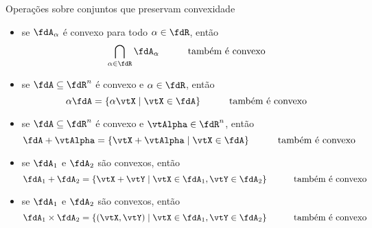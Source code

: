 \begin{frame}{Operações sobre conjuntos que preservam convexidade}
  \vspace*{-0.5\baselineskip}
  \begin{itemize}\footnotesize{}
    \item {}  se $ \fdA_{\alpha}$ é convexo para todo $\alpha \in \fdR$, então %
    \begin{equation}\label{eq_oper_inter}
      \bigcap_{\alpha \in \fdR} \fdA_{\alpha} \quad \quad \quad \text{também é convexo}
    \end{equation} %

    \item {}  se $ \fdA \subseteq \fdR^n$ é convexo e $\alpha \in \fdR$, então %
    \begin{equation}\label{eq_oper_escalar}
      \alpha \fdA = \{ \alpha \vtX \mid \vtX \in \fdA \} \quad \quad \quad \text{também é convexo}
    \end{equation} 
    
    \item {}  se $ \fdA \subseteq \fdR^n$ é convexo e $\vtAlpha \in \fdR^n$, então %
    \begin{equation}\label{eq_oper_trans}
      \fdA + \vtAlpha = \{ \vtX + \vtAlpha \mid \vtX \in \fdA \} \quad \quad \quad \text{também é convexo}
    \end{equation} %

    \item {}  se $\fdA_{1}$ e $\fdA_{2}$ são convexos, então %
    \begin{equation}\label{eq_oper_soma}
      \fdA_{1} + \fdA_{2} = \{ \vtX + \vtY \mid \vtX \in \fdA_{1}, \vtY \in \fdA_{2}\} \quad \quad \quad \text{também é convexo}
    \end{equation} %
      
    \item {}  se $\fdA_{1}$ e $\fdA_{2}$ são convexos, então %
    \begin{equation}\label{eq_oper_pcart}
      \fdA_{1} \times \fdA_{2} = \{ (\vtX, \vtY) \mid \vtX \in \fdA_{1}, \vtY \in \fdA_{2}\}\quad \quad \quad \text{também é convexo}
    \end{equation} %
  \end{itemize}
\end{frame}


